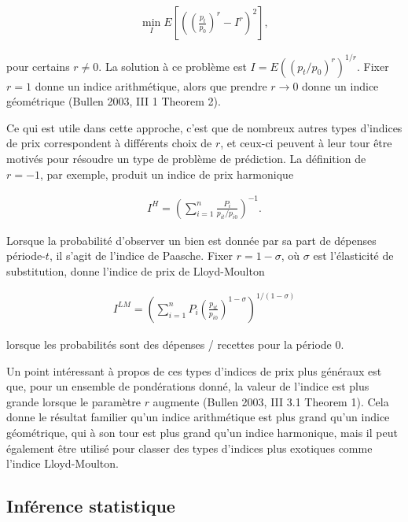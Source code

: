 \documentclass[]{article}
\begin{document}
\begin{align*}
\min_{I} E\left[\left(\left(\frac{p_{t}}{p_{0}} \right)^{r} - I^{r} \right)^{2} \right],
\end{align*}

pour certains \(r \neq 0\). La solution à ce problème est \(I = E((p_{t} / p_{0})^{r})^{1 / r}\). Fixer \(r = 1\) donne un indice arithmétique, alors que prendre \(r \rightarrow 0\) donne un indice géométrique (Bullen 2003, III 1 Theorem 2).

Ce qui est utile dans cette approche, c'est que de nombreux autres types d'indices de prix correspondent à différents choix de \(r\), et ceux-ci peuvent à leur tour être motivés pour résoudre un type de problème de prédiction. La définition de \(r = -1\), par exemple, produit un indice de prix harmonique

\begin{align*}
I^{H} = \left(\sum_{i = 1}^{n} \frac{P_{i}}{p_{it} / p_{i0}} \right)^{- 1}.
\end{align*}

Lorsque la probabilité d'observer un bien est donnée par sa part de dépenses période-\(t\), il s'agit de l'indice de Paasche. Fixer \(r = 1 - \sigma\), où \(\sigma\) est l'élasticité de substitution, donne l'indice de prix de Lloyd-Moulton

\begin{align*}
I^{LM} = \left(\sum_{i = 1}^{n} P_{i} \left(\frac{p_{it}}{p_{i0}} \right)^{1 - \sigma } \right)^{1 / (1 - \sigma)}
\end{align*}

lorsque les probabilités sont des dépenses / recettes pour la période 0.

Un point intéressant à propos de ces types d'indices de prix plus généraux est que, pour un ensemble de pondérations donné, la valeur de l'indice est plus grande lorsque le paramètre \(r\) augmente (Bullen 2003, III 3.1 Theorem 1). Cela donne le résultat familier qu'un indice arithmétique est plus grand qu'un indice géométrique, qui à son tour est plus grand qu'un indice harmonique, mais il peut également être utilisé pour classer des types d'indices plus exotiques comme l'indice Lloyd-Moulton.

\hypertarget{infuxe9rence-statistique}{%
\subsection{Inférence statistique}\label{infuxe9rence-statistique}}
\end{document}
